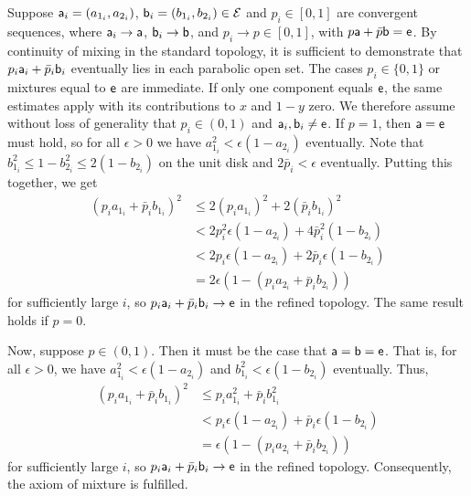 \begin{example}
	Suppose $\ens[a]_i = (a_{1_i},a_{2_i})$, $\ens[b]_i = (b_{1_i},b_{2_i}) \in \Ens$ and $p_i \in [0,1]$ are convergent sequences, where $\ens[a]_i \to \ens[a]$, $\ens[b]_i \to \ens[b]$, and $p_i \to p \in [0,1]$, with $p\ens[a] + \bar{p}\ens[b] = \ens[e]$. By continuity of mixing in the standard topology, it is sufficient to demonstrate that $p_i\ens[a]_i + \bar{p}_i\ens[b]_i$ eventually lies in each parabolic open set. The cases $p_i\in\{0,1\}$ or mixtures equal to $\ens[e]$ are immediate. If only one component equals $\ens[e]$, the same estimates apply with its contributions to $x$ and $1-y$ zero. We therefore assume without loss of generality that $p_i\in(0,1)$ and $\ens[a]_i,\ens[b]_i\neq\ens[e]$. If $p = 1$, then $\ens[a] = \ens[e]$ must hold, so for all $\epsilon > 0$ we have $a_{1_i}^2 < \epsilon(1-a_{2_i})$ eventually. Note that $b_{1_i}^2 \le 1 - b_{2_i}^2 \le 2(1 - b_{2_i})$ on the unit disk and $2\bar{p}_i < \epsilon$ eventually. Putting this together, we get
	\begin{equation}
		\begin{aligned}
			(p_ia_{1_i} + \bar{p}_ib_{1_i})^2 
			&\le 2(p_ia_{1_i})^2 + 2(\bar{p}_ib_{1_i})^2 \\
			&< 2p_i^2\epsilon(1 - a_{2_i}) + 4\bar{p}_i^2(1 - b_{2_i}) \\ 
			&< 2p_i\epsilon(1 - a_{2_i}) + 2\bar{p}_i\epsilon(1 - b_{2_i}) \\
			&= 2\epsilon(1 - (p_ia_{2_i} + \bar{p}_ib_{2_i}))
		\end{aligned}
	\end{equation}
	for sufficiently large $i$, so $p_i\ens[a]_i+\bar{p}_i\ens[b]_i \to \ens[e]$ in the refined topology. The same result holds if $p = 0$.
	
	Now, suppose $p \in (0,1)$. Then it must be the case that $\ens[a] = \ens[b] = \ens[e]$. That is, for all $\epsilon > 0$, we have $a_{1_i}^2 < \epsilon(1-a_{2_i})$ and $b_{1_i}^2 < \epsilon(1-b_{2_i})$ eventually. Thus,
	\begin{equation}
		\begin{aligned}
			(p_ia_{1_i}+\bar{p}_ib_{1_i})^2 &\le p_ia_{1_i}^2 + \bar{p}_ib_{1_i}^2 \\
			&< p_i\epsilon(1 - a_{2_i}) + \bar{p}_i\epsilon(1 - b_{2_i}) \\
			&= \epsilon(1 - (p_ia_{2_i} + \bar{p}_ib_{2_i}))
		\end{aligned}
	\end{equation}
	for sufficiently large $i$, so $p_i\ens[a]_i+\bar{p}_i\ens[b]_i \to \ens[e]$ in the refined topology. Consequently, the axiom of mixture is fulfilled.
	

\end{example}
